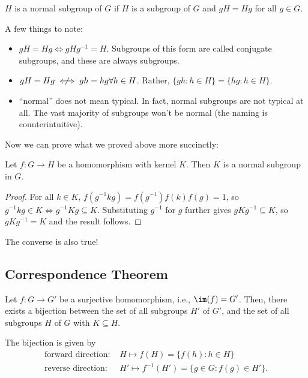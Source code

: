 \begin{definition}

$H$ is a \ac{normal subgroup} of $G$ if $H$ is a subgroup of $G$ and $gH=Hg$ for all $g\in G$. 
\end{definition}

A few things to note:
\begin{itemize}
    \item $gH=Hg\iff gHg^{-1}=H$. Subgroups of this form are called \ac{conjugate subgroups}, and these are always subgroups. 
    \item $gH=Hg\centernot\iff gh=hg\forall h\in H$. Rather, $\{gh : h\in H\} = \{hg : h\in H\}$. 
    \item ``normal'' does not mean typical. In fact, normal subgroups are not typical at all. The vast majority of subgroups won't be normal (the naming is counterintuitive). 
\end{itemize}

Now we can prove what we proved above more succinctly:
\begin{theorem}
\proplabel

Let $f:G\rightarrow H$ be a homomorphism with kernel $K$. Then $K$ is a normal subgroup in $G$.
\end{theorem}

\begin{proof}
For all $k\in K$,
$f(g^{-1}kg) = f(g^{-1})f(k)f(g) = 1$, so $g^{-1}kg\in K\iff g^{-1}Kg\subseteq K$. Substituting $g^{-1}$ for $g$ further gives $gKg^{-1}\subseteq K$, so $gKg^{-1}=K$ and the result follows. 
\end{proof}

The converse is also true!

\subsection{Correspondence Theorem}

\begin{theorem}

Let $f:G\rightarrow G'$ be a surjective homomorphism, i.e., $\im (f) = G'$. Then, there exists a bijection between the set of all subgroups $H'$ of $G'$, and the set of all subgroups $H$ of $G$ with $K\subseteq H$. 

The bijection is given by
\begin{align*}
    \text{forward direction: }&H\mapsto f(H) = \{f(h) : h\in H\}\\
    \text{reverse direction: }&H'\mapsto f^{-1}(H') = \{g\in G : f(g)\in H'\}.
\end{align*}
\end{theorem}

